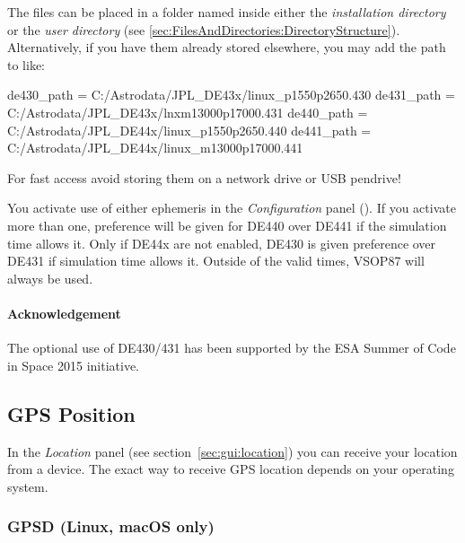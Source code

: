 The files can be placed in a folder named  inside either
the \emph{installation directory} or the \emph{user directory}
(see \ref{sec:FilesAndDirectories:DirectoryStructure}). Alternatively,
if you have them already stored elsewhere, you may add the path to
 like:
\begin{configfile}
[astro]
de430_path = C:/Astrodata/JPL_DE43x/linux_p1550p2650.430
de431_path = C:/Astrodata/JPL_DE43x/lnxm13000p17000.431
de440_path = C:/Astrodata/JPL_DE44x/linux_p1550p2650.440
de441_path = C:/Astrodata/JPL_DE44x/linux_m13000p17000.441
\end{configfile}

For fast access avoid storing them on a network drive or USB pendrive!

You activate use of either ephemeris in the \emph{Configuration} panel
(). If you activate more than one, preference will be given
for DE440 over DE441 if the simulation time allows it. Only if DE44x
are not enabled, DE430 is given preference over DE431 if simulation
time allows it.  Outside of the valid times, VSOP87 will always be
used.

\paragraph{Acknowledgement}
The optional use of DE430/431 has been supported by the ESA Summer of
Code in Space 2015 initiative.

\subsection{GPS Position}
\label{sec:ExtraData:GPS}

\noindent In the \emph{Location} panel (see
section~\ref{sec:gui:location}) you can receive your location from a
 device.   The exact way to receive
GPS location depends on your operating system. 

\subsubsection{GPSD (Linux, macOS only)}
\label{sec:ExtraData:GPS:GPSD}

